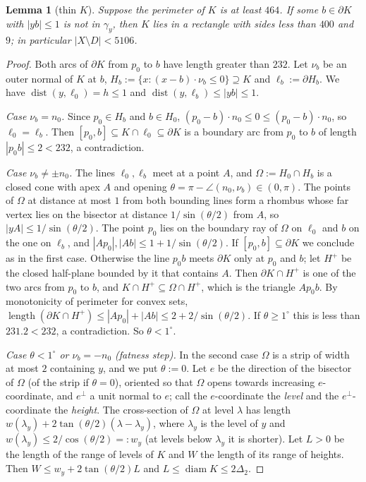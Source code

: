 \documentclass[11pt]{amsart}
\newtheorem{lemma}[theorem]{Lemma}
\theoremstyle{definition}
\theoremstyle{remark}
\newcommand{\Dt}{\Delta_2}
\newcommand{\dist}{\operatorname{dist}}
\begin{document}
\begin{lemma}[thin $K$]\label{lem:thin}
Suppose the perimeter of $K$ is at least $464$. If some $b\in\partial K$ with $|yb|\le1$ is not in $\gamma_y$, then $K$ lies in a rectangle with sides less than $400$ and $9$; in particular $|X\setminus D|<5106$.
\end{lemma}
\begin{proof}
Both arcs of $\partial K$ from $p_0$ to $b$ have length greater than $232$. Let $\nu_b$ be an outer normal of $K$ at $b$, $H_b:=\{x:(x-b)\cdot\nu_b\le0\}\supseteq K$ and $\ell_b:=\partial H_b$. We have $\dist(y,\ell_0)=h\le1$ and $\dist(y,\ell_b)\le|yb|\le1$.

\emph{Case $\nu_b=n_0$.} Since $p_0\in H_b$ and $b\in H_0$, $(p_0-b)\cdot n_0\le0\le(p_0-b)\cdot n_0$, so $\ell_0=\ell_b$. Then $[p_0,b]\subseteq K\cap\ell_0\subseteq\partial K$ is a boundary arc from $p_0$ to $b$ of length $|p_0b|\le2<232$, a contradiction.

\emph{Case $\nu_b\ne\pm n_0$.} The lines $\ell_0,\ell_b$ meet at a point $A$, and $\Omega:=H_0\cap H_b$ is a closed cone with apex $A$ and opening $\theta=\pi-\angle(n_0,\nu_b)\in(0,\pi)$. The points of $\Omega$ at distance at most $1$ from both bounding lines form a rhombus whose far vertex lies on the bisector at distance $1/\sin(\theta/2)$ from $A$, so $|yA|\le1/\sin(\theta/2)$. The point $p_0$ lies on the boundary ray of $\Omega$ on $\ell_0$ and $b$ on the one on $\ell_b$, and $|Ap_0|,|Ab|\le1+1/\sin(\theta/2)$. If $[p_0,b]\subseteq\partial K$ we conclude as in the first case. Otherwise the line $p_0b$ meets $\partial K$ only at $p_0$ and $b$; let $H^+$ be the closed half-plane bounded by it that contains $A$. Then $\partial K\cap H^+$ is one of the two arcs from $p_0$ to $b$, and $K\cap H^+\subseteq\Omega\cap H^+$, which is the triangle $Ap_0b$. By monotonicity of perimeter for convex sets, $\operatorname{length}(\partial K\cap H^+)\le|Ap_0|+|Ab|\le2+2/\sin(\theta/2)$. If $\theta\ge1^\circ$ this is less than $231.2<232$, a contradiction. So $\theta<1^\circ$.

\emph{Case $\theta<1^\circ$ or $\nu_b=-n_0$ (fatness step).} In the second case $\Omega$ is a strip of width at most $2$ containing $y$, and we put $\theta:=0$. Let $e$ be the direction of the bisector of $\Omega$ (of the strip if $\theta=0$), oriented so that $\Omega$ opens towards increasing $e$-coordinate, and $e^\perp$ a unit normal to $e$; call the $e$-coordinate the \emph{level} and the $e^\perp$-coordinate the \emph{height}. The cross-section of $\Omega$ at level $\lambda$ has length $w(\lambda_y)+2\tan(\theta/2)(\lambda-\lambda_y)$, where $\lambda_y$ is the level of $y$ and $w(\lambda_y)\le2/\cos(\theta/2)=:w_y$ (at levels below $\lambda_y$ it is shorter). Let $L>0$ be the length of the range of levels of $K$ and $W$ the length of its range of heights. Then $W\le w_y+2\tan(\theta/2)L$ and $L\le\operatorname{diam}K\le2\Dt$.


\end{proof}
\end{document}

